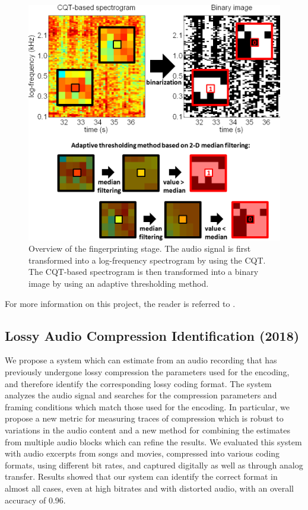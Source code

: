 \documentclass{article}
\begin{document}
\begin{figure}[!htb]
\centering
\includegraphics[width=\columnwidth]{Images/thresholding.png}
\caption{Overview of the fingerprinting stage. The audio signal is first transformed into a log-frequency spectrogram by using the CQT. The CQT-based spectrogram is then transformed into a binary image by using an adaptive thresholding method.}
\label{fig:thresholding}
\end{figure}

For more information on this project, the reader is referred to \cite{inproceedings_rafii_may2014}.


\subsection{Lossy Audio Compression Identification (2018)}
\label{ssec:compression}

We propose a system which can estimate from an audio recording that has previously undergone lossy compression the parameters used for the encoding, and therefore identify the corresponding lossy coding format. The system analyzes the audio signal and searches for the compression parameters and framing conditions which match those used for the encoding. In particular, we propose a new metric for measuring traces of compression which is robust to variations in the audio content and a new method for combining the estimates from multiple audio blocks which can refine the results. We evaluated this system with audio excerpts from songs and movies, compressed into various coding formats, using different bit rates, and captured digitally as well as through analog transfer. Results showed that our system can identify the correct format in almost all cases, even at high bitrates and with distorted audio, with an overall accuracy of 0.96.
\end{document}
